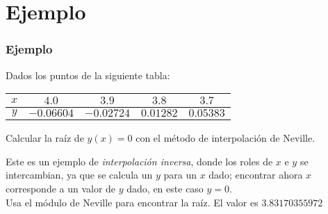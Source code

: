 \section{Ejemplo}
\begin{frame}
\frametitle{Ejemplo}
Dados los puntos de la siguiente tabla:
\begin{table}[htbp]
\centering \small
\begin{tabulary}{15cm}{c | c | c | c | c | }
$x$ & $4.0$ & $3.9$ & $3.8$ & $3.7$ \\
\midrule $y$ & $-0.06604$ & $-0.02724$ & $0.01282$ & $0.05383$ 
\end{tabulary}
\end{table}
Calcular la raíz de $y(x)=0$ con el método de interpolación de Neville.
\end{frame}
\begin{frame}
Este es un ejemplo de \textit{interpolación inversa}, donde los roles de $x$ e $y$ se intercambian, ya que se calcula un $y$ para un $x$ dado; encontrar ahora $x$ corresponde a un valor de $y$ dado, en este caso $y=0$. 
\\
\bigskip
Usa el módulo de Neville para encontrar la raíz. El valor es $3.83170355972$
\end{frame}
